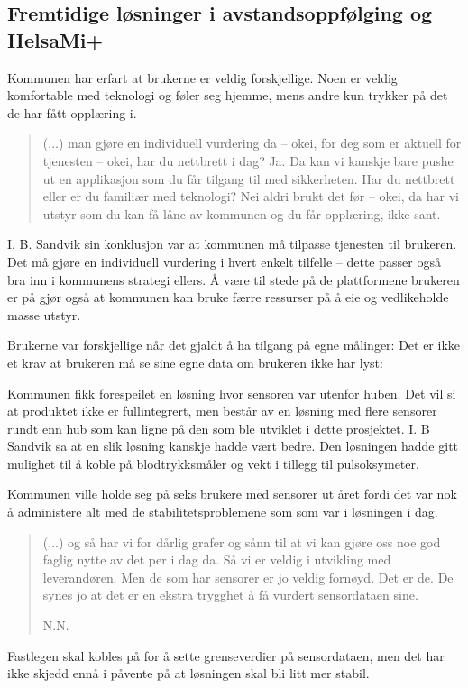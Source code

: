 \subsection{Fremtidige løsninger i avstandsoppfølging og HelsaMi+}
Kommunen har erfart at brukerne er veldig forskjellige. Noen er veldig komfortable med teknologi og føler seg hjemme, mens andre
kun trykker på det de har fått opplæring i.
\blockquote{
(...) man gjøre en individuell vurdering da -- okei, for deg som er aktuell for tjenesten -- okei, har du nettbrett i dag? Ja.
Da kan vi kanskje bare pushe ut en applikasjon som
du får tilgang til med sikkerheten. Har du nettbrett eller er du familiær med teknologi? Nei aldri brukt det før -- okei,
da har vi utstyr som du kan få låne av kommunen og du får opplæring, ikke sant.
}

I. B. Sandvik sin konklusjon var at kommunen må tilpasse tjenesten til brukeren. Det må gjøre en individuell vurdering i hvert enkelt tilfelle --
dette passer også bra inn i kommunens strategi ellers. Å være til stede på de plattformene brukeren er på gjør også at kommunen kan
bruke færre ressurser på å eie og vedlikeholde masse utstyr.

Brukerne var forskjellige når det gjaldt å ha tilgang på egne målinger: 
Det er ikke et krav at brukeren må se sine egne data om brukeren ikke har lyst: 

Kommunen fikk forespeilet en løsning hvor sensoren var utenfor huben. Det vil si at produktet ikke er fullintegrert, men består
av en løsning med flere sensorer rundt enn hub som kan ligne på den som ble utviklet i dette prosjektet. I. B Sandvik sa
at en slik løsning kanskje hadde vært bedre. Den løsningen hadde gitt mulighet til å koble på blodtrykksmåler og vekt i tillegg til
pulsoksymeter.

Kommunen ville holde seg på seks brukere med sensorer ut året fordi det var nok å administere alt med de stabilitetsproblemene som
som var i løsningen i dag.
\blockquote[N.N.]{(...) og så har vi for dårlig grafer og sånn til at vi kan gjøre oss noe god faglig nytte av det per i dag da. Så vi
    er veldig i utvikling med leverandøren. Men de som har sensorer er jo veldig fornøyd. Det er de.
De synes jo at det er en ekstra trygghet å få vurdert sensordataen sine.} Fastlegen skal kobles på for å sette grenseverdier på sensordataen,
men det har ikke skjedd ennå i påvente på at løsningen skal bli litt mer stabil.


